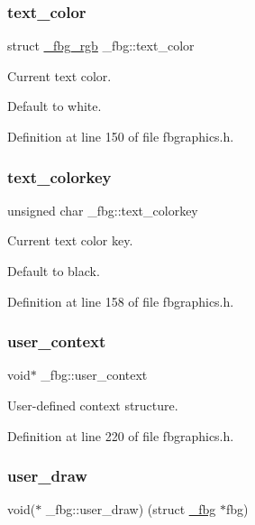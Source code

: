 \subsubsection{\texorpdfstring{text\+\_\+color}{text\_color}}
{\footnotesize\ttfamily struct \mbox{\hyperlink{fbgraphics_8h_struct__fbg__rgb}{\+\_\+fbg\+\_\+rgb}} \+\_\+fbg\+::text\+\_\+color}



Current text color. 

Default to white. 

Definition at line 150 of file fbgraphics.\+h.

\mbox{\label{struct__fbg_a06e65293cf0b48e70d76d63f5de453e6}} 
\subsubsection{\texorpdfstring{text\+\_\+colorkey}{text\_colorkey}}
{\footnotesize\ttfamily unsigned char \+\_\+fbg\+::text\+\_\+colorkey}



Current text color key. 

Default to black. 

Definition at line 158 of file fbgraphics.\+h.

\mbox{\label{struct__fbg_ae3ecac18abee9dedabacaca9bb063bde}} 
\subsubsection{\texorpdfstring{user\+\_\+context}{user\_context}}
{\footnotesize\ttfamily void$\ast$ \+\_\+fbg\+::user\+\_\+context}



User-\/defined context structure. 



Definition at line 220 of file fbgraphics.\+h.

\mbox{\label{struct__fbg_ac66a762877982c6f381a7cfd54a8f17e}} 
\subsubsection{\texorpdfstring{user\+\_\+draw}{user\_draw}}
{\footnotesize\ttfamily void($\ast$ \+\_\+fbg\+::user\+\_\+draw) (struct \mbox{\hyperlink{struct__fbg}{\+\_\+fbg}} $\ast$fbg)}



